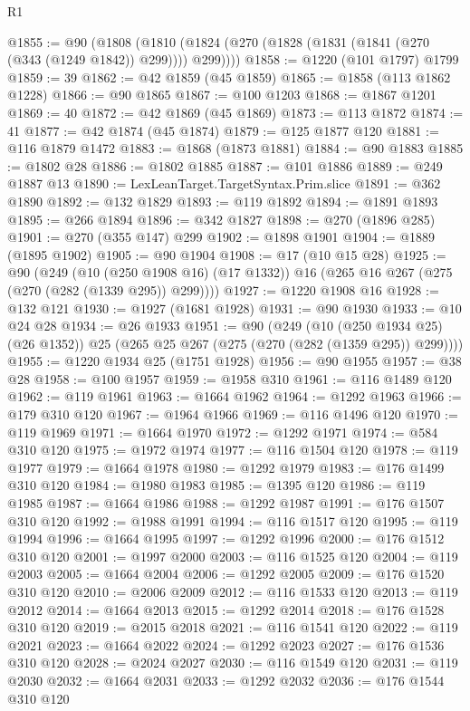 \begin{lexlean}{R1}
\begin{coremodule}
@1855 := @90
    (@1808 (@1810 (@1824 (@270 (@1828 (@1831 (@1841 (@270 (@343 (@1249 @1842)) @299)))) @299))))
@1858 := @1220 (@101 @1797) @1799
@1859 := 39
@1862 := @42 @1859 (@45 @1859)
@1865 := @1858 (@113 @1862 @1228)
@1866 := @90 @1865
@1867 := @100 @1203
@1868 := @1867 @1201
@1869 := 40
@1872 := @42 @1869 (@45 @1869)
@1873 := @113 @1872
@1874 := 41
@1877 := @42 @1874 (@45 @1874)
@1879 := @125 @1877 @120
@1881 := @116 @1879 @1472
@1883 := @1868 (@1873 @1881)
@1884 := @90 @1883
@1885 := @1802 @28
@1886 := @1802 @1885
@1887 := @101 @1886
@1889 := @249 @1887 @13
@1890 := LexLeanTarget.TargetSyntax.Prim.slice
@1891 := @362 @1890
@1892 := @132 @1829
@1893 := @119 @1892
@1894 := @1891 @1893
@1895 := @266 @1894
@1896 := @342 @1827
@1898 := @270 (@1896 @285)
@1901 := @270 (@355 @147) @299
@1902 := @1898 @1901
@1904 := @1889 (@1895 @1902)
@1905 := @90 @1904
@1908 := @17 (@10 @15 @28)
@1925 := @90
    (@249
      (@10 (@250 @1908 @16) (@17 @1332))
      @16
      (@265 @16 @267 (@275 (@270 (@282 (@1339 @295)) @299))))
@1927 := @1220 @1908 @16
@1928 := @132 @121
@1930 := @1927 (@1681 @1928)
@1931 := @90 @1930
@1933 := @10 @24 @28
@1934 := @26 @1933
@1951 := @90
    (@249
      (@10 (@250 @1934 @25) (@26 @1352))
      @25
      (@265 @25 @267 (@275 (@270 (@282 (@1359 @295)) @299))))
@1955 := @1220 @1934 @25 (@1751 @1928)
@1956 := @90 @1955
@1957 := @38 @28
@1958 := @100 @1957
@1959 := @1958 @310
@1961 := @116 @1489 @120
@1962 := @119 @1961
@1963 := @1664 @1962
@1964 := @1292 @1963
@1966 := @179 @310 @120
@1967 := @1964 @1966
@1969 := @116 @1496 @120
@1970 := @119 @1969
@1971 := @1664 @1970
@1972 := @1292 @1971
@1974 := @584 @310 @120
@1975 := @1972 @1974
@1977 := @116 @1504 @120
@1978 := @119 @1977
@1979 := @1664 @1978
@1980 := @1292 @1979
@1983 := @176 @1499 @310 @120
@1984 := @1980 @1983
@1985 := @1395 @120
@1986 := @119 @1985
@1987 := @1664 @1986
@1988 := @1292 @1987
@1991 := @176 @1507 @310 @120
@1992 := @1988 @1991
@1994 := @116 @1517 @120
@1995 := @119 @1994
@1996 := @1664 @1995
@1997 := @1292 @1996
@2000 := @176 @1512 @310 @120
@2001 := @1997 @2000
@2003 := @116 @1525 @120
@2004 := @119 @2003
@2005 := @1664 @2004
@2006 := @1292 @2005
@2009 := @176 @1520 @310 @120
@2010 := @2006 @2009
@2012 := @116 @1533 @120
@2013 := @119 @2012
@2014 := @1664 @2013
@2015 := @1292 @2014
@2018 := @176 @1528 @310 @120
@2019 := @2015 @2018
@2021 := @116 @1541 @120
@2022 := @119 @2021
@2023 := @1664 @2022
@2024 := @1292 @2023
@2027 := @176 @1536 @310 @120
@2028 := @2024 @2027
@2030 := @116 @1549 @120
@2031 := @119 @2030
@2032 := @1664 @2031
@2033 := @1292 @2032
@2036 := @176 @1544 @310 @120

\end{coremodule}
\end{lexlean}
